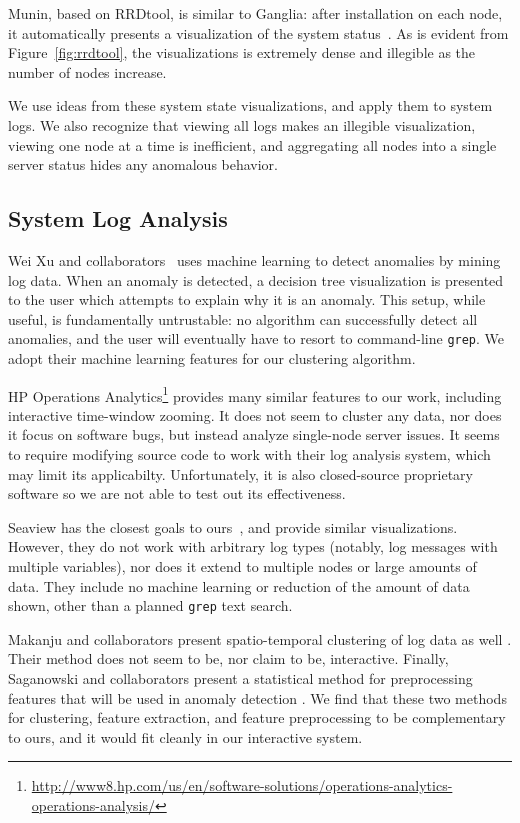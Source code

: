 \documentclass[conference]{style/acmsiggraph}
\begin{document}
Munin, based on RRDtool, is similar to Ganglia: after installation on each node, it automatically presents a visualization of the system status~\cite{Oetiker99}.
As is evident from Figure~\ref{fig:rrdtool}, the visualizations is extremely dense and illegible as the number of nodes increase.

We use ideas from these system state visualizations, and apply them to system logs.
We also recognize that viewing all logs makes an illegible visualization, viewing one node at a time is inefficient, and aggregating all nodes into a single server status hides any anomalous behavior.

\subsection{System Log Analysis}

Wei Xu and collaborators~\cite{Xu09} uses machine learning to detect anomalies by mining log data.
When an anomaly is detected, a decision tree visualization is presented to the user which attempts to explain why it is an anomaly.
This setup, while useful, is fundamentally untrustable: no algorithm can successfully detect all anomalies, and the user will eventually have to resort to command-line \texttt{grep}.
We adopt their machine learning features for our clustering algorithm.

HP Operations Analytics\footnote{\url{http://www8.hp.com/us/en/software-solutions/operations-analytics-operations-analysis/}} provides many similar features to our work, including interactive time-window zooming.
It does not seem to cluster any data, nor does it focus on software bugs, but instead analyze single-node server issues.
It seems to require modifying source code to work with their log analysis system, which may limit its applicabilty.
Unfortunately, it is also closed-source proprietary software so we are not able to test out its effectiveness.

Seaview has the closest goals to ours~\cite{hangalseaview}, and provide similar visualizations.
However, they do not work with arbitrary log types (notably, log messages with multiple variables), nor does it extend to multiple nodes or large amounts of data.
They include no machine learning or reduction of the amount of data shown, other than a planned \texttt{grep} text search.

Makanju and collaborators present spatio-temporal clustering of log data as well \cite{makanju2012spatio}.
Their method does not seem to be, nor claim to be, interactive.
Finally, Saganowski and collaborators present a statistical method for preprocessing features that will be used in anomaly detection \cite{preprocessor}.
We find that these two methods for clustering, feature extraction, and feature preprocessing to be complementary to ours, and it would fit cleanly in our interactive system.
\end{document}
